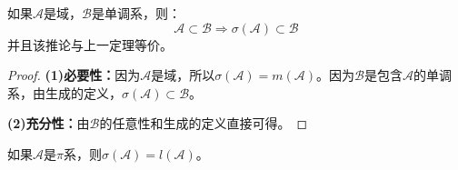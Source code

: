 \begin{corollary}\label{cor:SigmaField=MonotoneField}
	如果$\mathscr{A}$是域，$\mathscr{B}$是单调系，则：
	\begin{equation*}
		\mathscr{A}\subset \mathscr{B}\Rightarrow\sigma(\mathscr{A})\subset \mathscr{B}
	\end{equation*}
	并且该推论与上一定理等价。
\end{corollary}
\begin{proof}
	\textbf{(1)必要性：}因为$\mathscr{A}$是域，所以$\sigma(\mathscr{A})=m(\mathscr{A})$。因为$\mathscr{B}$是包含$\mathscr{A}$的单调系，由生成的定义，$\sigma(\mathscr{A})\subset \mathscr{B}$。\par
	\textbf{(2)充分性：}由$\mathscr{B}$的任意性和生成的定义直接可得。
\end{proof}
\begin{theorem}\label{theo:SigmaPi=LambdaPi}
	如果$\mathscr{A}$是$\pi$系，则$\sigma(\mathscr{A})=l(\mathscr{A})$。
\end{theorem}
